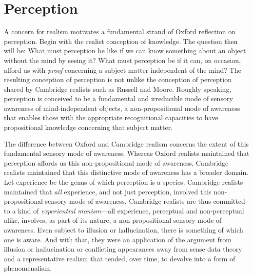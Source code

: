 \documentclass[11pt]{article}
\title{\mytitle}
\author{\myauthor}
\begin{document}
\maketitle

\setlength{\parindent}{1em}


% 
% 
% 

\section{Perception} %
\label{sec:perception}

A concern for realism motivates a fundamental strand of Oxford reflection on perception. Begin with the realist conception of knowledge.  The question then will be: What must perception be like if we can know something about an object without the mind by seeing it? What must perception be if it can, on occasion, afford us with \emph{proof} concerning a subject matter independent of the mind? The resulting conception of perception is not unlike the conception of perception shared by Cambridge realists such as Russell and Moore. Roughly speaking, perception is conceived to be a fundamental and irreducible mode of sensory awareness of mind-independent objects, a non-propositional mode of awareness that enables those with the appropriate recognitional capacities to have propositional knowledge concerning that subject matter. 

The difference between Oxford and Cambridge realism concerns the extent of this fundamental sensory mode of awareness. Whereas Oxford realists maintained that perception affords us this non-propositional mode of awareness, Cambridge realists maintained that this distinctive mode of awareness has a broader domain. Let experience be the genus of which perception is a species. Cambridge realists maintained that \emph{all} experience, and not just perception, involved this non-propositional sensory mode of awareness. Cambridge realists are thus committed to a kind of \emph{experiential monism}---all experience, perceptual and non-perceptual alike, involves, as part of its nature, a non-propositional sensory mode of awareness. Even subject to illusion or hallucination, there is something of which one is aware. And with that, they were an application of the argument from illusion or hallucination or conflicting appearances away from sense data theory and a representative realism that tended, over time, to devolve into a form of phenomenalism.
\end{document}
